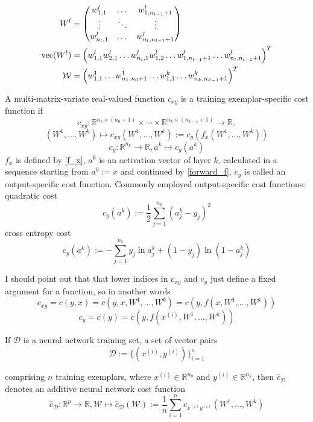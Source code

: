 \documentclass{article}
\def\RealSet{\mathbb{R}}
\DeclareMathOperator{\vect}{vec}
\begin{document}
\begin{align}
W^l &= \begin{pmatrix}
w^l_{1,1} & \dots & w^l_{1,n_{l-1}+1} \\
\vdots & \ddots & \vdots \\
w^l_{n_{l},1} & \dots & w^l_{n_{l},n_{l-1}+1}
\end{pmatrix} \\
\vect(W^l) &= \Bigl( w^l_{1,1} w^l_{2,1} \dots w^l_{n_{l},1} w^l_{1,2} \dots w^l_{1,n_{l-1}+1} \dots w^l_{n_{l},n_{l-1}+1}\Bigr)^T \\
\mathcal{W} &= \Bigl( w^1_{1,1} \dots w^1_{n_1,n_0+1} \dots  w^k_{1,1} \dots w^k_{n_k,n_{k-1}+1} \Bigr)^T
\end{align}


A multi-matrix-variate real-valued function $c_{xy}$ is a training exemplar-specific cost function if
\[
c_{xy} \colon \RealSet^{n_1 \times (n_0 + 1)} \times \cdots \times \RealSet^{n_k \times (n_{k-1} + 1)} \rightarrow \RealSet,
\]
\begin{equation}\label{output_specific_cost_function}
(W^1,\dots,W^k) \mapsto c_{xy}(W^1,\dots,W^k) := c_y(f_x(W^1,\dots,W^k))
\end{equation}
\[
c_y \colon \RealSet^{n_k} \rightarrow \RealSet, a^k \mapsto c_y(a^k)
\]
$f_x$ is defined by \eqref{f_x}, $a^k$ is an activation vector of layer $k$, calculated in a sequence starting from $a^0 := x$ and continued by \eqref{forward_f}, $c_y$ is called an output-specific cost function.
Commonly employed output-specific cost functions: quadratic cost
\[
c_y(a^k) := \frac{1}{2}\sum_{j=1}^{n_k}(a_j^k - y_j)^2
\]
cross entropy cost
\[
  c_y(a^k) := - \sum_{j=1}^{n_k}y_j \ln a_j^k + (1-y_j)\ln(1-a_j^k)
\]

I should point out that that lower indices in $c_{xy}$ and $c_y$ just define a fixed argument for a function, so in another words
\[
c_{xy} = c(y, x) = c(y, x, W^1,\dots,W^k) = c(y, f(x, W^1,\dots,W^k))
\]
\[
c_y = c(y) = c(y, f(x^{(i)}, W^1,\dots,W^k))
\]

If $\mathcal{D}$ is a neural network training set, a set of vector pairs
\[
\mathcal{D} := \bigl\{ (x^{(i)}, y^{(i)}) \bigr\}_{i=1}^n
\]

comprising $n$ training exemplars, where $x^{(i)} \in \RealSet^{n_0}$ and $y^{(i)} \in \RealSet^{n_k}$, then $\hat c_{\mathcal{D}}$ denotes an additive neural network cost function
\begin{equation}\label{additive_cost_function}
\hat c_{\mathcal{D}} \colon \RealSet^p \rightarrow \RealSet, \mathcal{W}\mapsto \hat c_{\mathcal{D}}(\mathcal{W}) := \frac{1}{n} \sum_{i=1}^{n}c_{x^{(i)}y^{(i)}}(W^1,\dots,W^k)
\end{equation}
\end{document}

